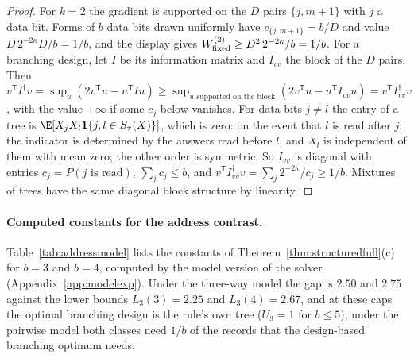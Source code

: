 \begin{proof}
For $k=2$ the gradient is supported on the $D$ pairs $\{j,m+1\}$ with $j$ a
data bit. Forms of $b$ data bits drawn uniformly have $c_{\{j,m+1\}}=b/D$ and
value $D\,2^{-2\kappa}D/b=1/b$, and the display gives
$W^{(2)}_{\rm fixed}\ge D^2\,2^{-2\kappa}/b=1/b$. For a branching design, let
$I$ be its information matrix and $I_{vv}$ the block of the $D$ pairs. Then
$v^{\mathsf T}I^\dagger v=\sup_u(2v^{\mathsf T}u-u^{\mathsf T}Iu)\ge\sup_{u\text{ supported on the block}}(2v^{\mathsf T}u-u^{\mathsf T}I_{vv}u)=v^{\mathsf T}I_{vv}^{\dagger}v$,
with the value $+\infty$ if some $c_j$ below vanishes.
For data bits $j\ne l$ the entry of a tree is
$\E[X_jX_l\mathbf 1\{j,l\in S_\tau(X)\}]$, which is zero: on the event that $l$
is read after $j$, the indicator is determined by the answers read before
$l$, and $X_l$ is independent of them with mean zero; the other order is
symmetric. So $I_{vv}$ is diagonal with entries $c_j=P(j\text{ is read})$,
$\sum_jc_j\le b$, and $v^{\mathsf T}I_{vv}^{\dagger}v=\sum_j2^{-2\kappa}/c_j\ge1/b$.
Mixtures of trees have the same diagonal block structure by linearity.
\end{proof}

\paragraph{Computed constants for the address contrast.}
Table~\ref{tab:addressmodel} lists the constants of
Theorem~\ref{thm:structuredfull}(c) for $b=3$ and $b=4$, computed by the
model version of the solver (Appendix~\ref{app:modelexp}). Under the
three-way model the gap is $2.50$ and $2.75$ against the lower bounds
$L_3(3)=2.25$ and $L_3(4)=2.67$, and at these caps the optimal branching
design is the rule's own tree ($U_3=1$ for $b\le5$); under the pairwise model
both classes need $1/b$ of the records that the design-based branching
optimum needs.


